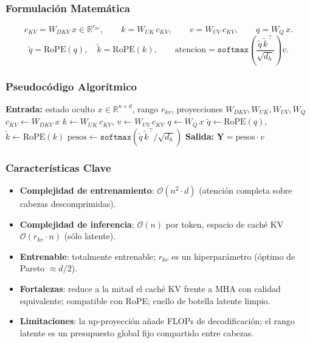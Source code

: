 \subsubsection{Formulación Matemática}
\[
c_{KV} = W_{DKV}\, x \in \mathbb{R}^{r_{kv}}, \qquad
k = W_{UK}\, c_{KV}, \qquad
v = W_{UV}\, c_{KV}, \qquad
q = W_{Q}\, x.
\]
\[
\tilde q = \text{RoPE}(q), \quad \tilde k = \text{RoPE}(k), \qquad
\text{atencion} = \texttt{softmax}\!\left(\frac{\tilde q\, \tilde k^\top}{\sqrt{d_h}}\right) v.
\]

\subsubsection{Pseudocódigo Algorítmico}
\begin{algorithmic}[1]
\State \textbf{Entrada:} estado oculto $x \in \mathbb{R}^{n \times d}$, rango $r_{kv}$, proyecciones $W_{DKV}, W_{UK}, W_{UV}, W_{Q}$
\State $c_{KV} \gets W_{DKV}\, x$ 
\State $k \gets W_{UK}\, c_{KV}$, \quad $v \gets W_{UV}\, c_{KV}$ 
\State $q \gets W_{Q}\, x$
\State $\tilde q \gets \text{RoPE}(q)$, \quad $\tilde k \gets \text{RoPE}(k)$ 
\State $\text{pesos} \gets \texttt{softmax}(\tilde q\, \tilde k^\top / \sqrt{d_h})$
\State \textbf{Salida:} $\mathbf{Y} = \text{pesos} \cdot v$
\end{algorithmic}

\subsubsection{Características Clave}
\begin{itemize}[leftmargin=*]
    \item \textbf{Complejidad de entrenamiento}: $\mathcal{O}(n^2 \cdot d)$ (atención completa sobre cabezas descomprimidas).
    \item \textbf{Complejidad de inferencia}: $\mathcal{O}(n)$ por token, espacio de caché KV $\mathcal{O}(r_{kv} \cdot n)$ (sólo latente).
    \item \textbf{Entrenable}: totalmente entrenable; $r_{kv}$ es un hiperparámetro (óptimo de Pareto $\approx d/2$).
    \item \textbf{Fortalezas}: reduce a la mitad el caché KV frente a MHA con calidad equivalente; compatible con RoPE; cuello de botella latente limpio.
    \item \textbf{Limitaciones}: la up-proyección añade FLOPs de decodificación; el rango latente es un presupuesto global fijo compartido entre cabezas.
\end{itemize}

